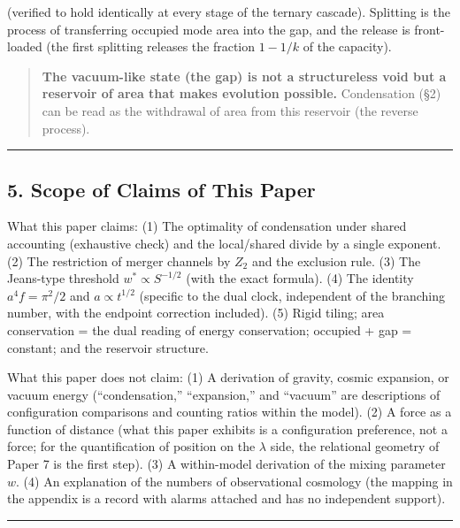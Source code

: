 \documentclass[
]{ltjsarticle}
\begin{document}
(verified to hold identically at every stage of the ternary cascade).
Splitting is the process of transferring occupied mode area into the
gap, and the release is front-loaded (the first splitting releases the
fraction \(1-1/k\) of the capacity).

\begin{quote}
\textbf{The vacuum-like state (the gap) is not a structureless void but
a reservoir of area that makes evolution possible.} Condensation (§2)
can be read as the withdrawal of area from this reservoir (the reverse
process).
\end{quote}

\begin{center}\rule{0.5\linewidth}{0.5pt}\end{center}

\subsection{5. Scope of Claims of This
Paper}\label{scope-of-claims-of-this-paper}

What this paper claims: (1) The optimality of condensation under shared
accounting (exhaustive check) and the local/shared divide by a single
exponent. (2) The restriction of merger channels by \(Z_2\) and the
exclusion rule. (3) The Jeans-type threshold \(w^*\propto S^{-1/2}\)
(with the exact formula). (4) The identity \(a^4f=\pi^2/2\) and
\(a\propto t^{1/2}\) (specific to the dual clock, independent of the
branching number, with the endpoint correction included). (5) Rigid
tiling; area conservation = the dual reading of energy conservation;
occupied + gap = constant; and the reservoir structure.

What this paper does not claim: (1) A derivation of gravity, cosmic
expansion, or vacuum energy (``condensation,'' ``expansion,'' and
``vacuum'' are descriptions of configuration comparisons and counting
ratios within the model). (2) A force as a function of distance (what
this paper exhibits is a configuration preference, not a force; for the
quantification of position on the \(\lambda\) side, the relational
geometry of Paper 7 is the first step). (3) A within-model derivation of
the mixing parameter \(w\). (4) An explanation of the numbers of
observational cosmology (the mapping in the appendix is a record with
alarms attached and has no independent support).

\begin{center}\rule{0.5\linewidth}{0.5pt}\end{center}
\end{document}
